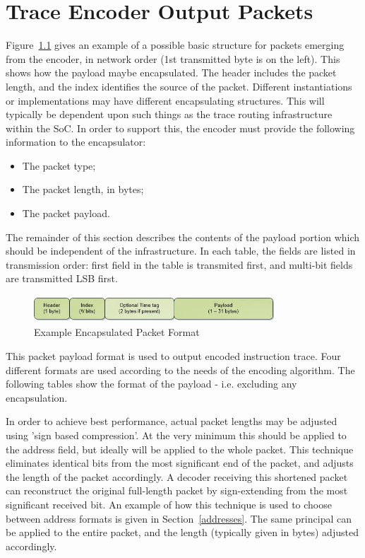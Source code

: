 \chapter{Trace Encoder Output Packets} \label{packets}

Figure~\ref{fig:packet-format} gives an example of a possible basic structure for 
packets emerging from the encoder, in network order (1st transmitted byte is on the left).
This shows how the payload maybe encapsulated.  The header includes the packet length, and 
the index identifies the source of the packet.  
Different instantiations or implementations may have different encapsulating structures.  
This will typically be dependent upon such things as the trace routing infrastructure within the 
SoC.  In order to support this, the encoder must provide the following information to the encapsulator:

\begin{itemize}
  \item The packet type;
  \item The packet length, in bytes;
  \item The packet payload.
\end{itemize}

The remainder of this section describes the contents of the payload
portion which should be independent of the infrastructure.  In each table, the fields are listed in
transmission order: first field in the table is transmited first, and multi-bit fields are 
transmitted LSB first.

\begin{figure}[h]
\begin{center}
  \includegraphics[height=1cm, width=9cm]{newPacket.jpg}
  \caption{Example Encapsulated Packet Format}
  \label{fig:packet-format}
\end{center}
\end{figure}


This packet payload format is used to output encoded instruction
trace.  Four different formats are used according to the needs of the
encoding algorithm. The following tables show the format of the
payload - i.e. excluding any encapsulation.

In order to achieve best performance, actual packet lengths may be adjusted using 'sign based compression'.
At the very minimum this should be applied to the address field, but ideally will be applied to the whole 
packet.  This technique eliminates identical bits from the most significant end of the packet, and adjusts
the length of the packet accordingly.  A decoder receiving this shortened packet can reconstruct the 
original full-length packet by sign-extending from the most significant received bit.  An example of how
this technique is used to choose between address formats is given in Section~\ref{addresses}.  The same
principal can be applied to the entire packet, and the length (typically given in bytes) adjusted 
accordingly.


